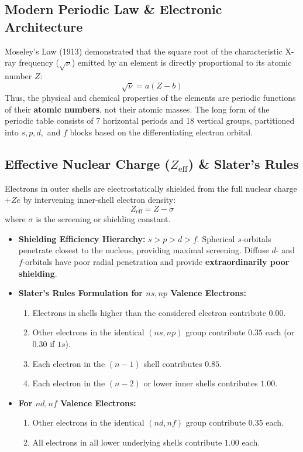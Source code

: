 \documentclass[10pt,twoside,openright]{book}
\begin{document}
\subsection{Modern Periodic Law \& Electronic Architecture}
Moseley's Law (1913) demonstrated that the square root of the characteristic X-ray frequency ($\sqrt{\nu}$) emitted by an element is directly proportional to its atomic number $Z$:
\begin{equation}
  \sqrt{\nu} = a(Z - b)
\end{equation}
Thus, the physical and chemical properties of the elements are periodic functions of their \textbf{atomic numbers}, not their atomic masses. The long form of the periodic table consists of 7 horizontal periods and 18 vertical groups, partitioned into $s, p, d,$ and $f$ blocks based on the differentiating electron orbital.

\subsection{Effective Nuclear Charge ($Z_{\text{eff}}$) \& Slater's Rules}
Electrons in outer shells are electrostatically shielded from the full nuclear charge $+Ze$ by intervening inner-shell electron density:
\begin{equation}
  Z_{\text{eff}} = Z - \sigma
\end{equation}
where $\sigma$ is the screening or shielding constant.
\begin{itemize}
  \item \textbf{Shielding Efficiency Hierarchy:} $s > p > d > f$.
  Spherical $s$-orbitals penetrate closest to the nucleus, providing maximal screening. Diffuse $d$- and $f$-orbitals have poor radial penetration and provide \textbf{extraordinarily poor shielding}.
  \item \textbf{Slater's Rules Formulation for $ns, np$ Valence Electrons:}
  \begin{enumerate}
    \item Electrons in shells higher than the considered electron contribute $0.00$.
    \item Other electrons in the identical $(ns, np)$ group contribute $0.35$ each (or $0.30$ if $1s$).
    \item Each electron in the $(n - 1)$ shell contributes $0.85$.
    \item Each electron in the $(n - 2)$ or lower inner shells contributes $1.00$.
  \end{enumerate}
  \item \textbf{For $nd, nf$ Valence Electrons:}
  \begin{enumerate}
    \item Other electrons in the identical $(nd, nf)$ group contribute $0.35$ each.
    \item All electrons in all lower underlying shells contribute $1.00$ each.
  \end{enumerate}
\end{itemize}
\end{document}
